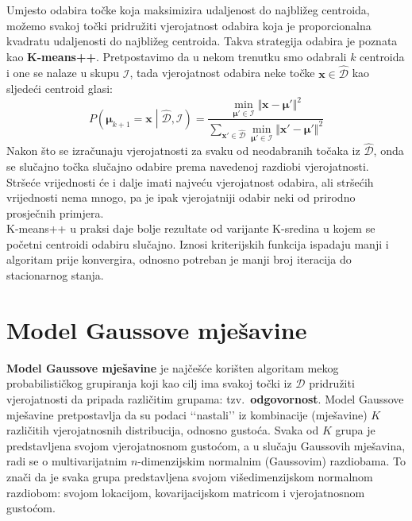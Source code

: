 \documentclass[times, utf8, zavrsni]{fer}
\begin{document}
Umjesto odabira točke koja maksimizira udaljenost do najbližeg centroida, možemo svakoj točki pridružiti vjerojatnost odabira koja je proporcionalna kvadratu udaljenosti do najbližeg centroida. Takva strategija odabira je poznata kao \textbf{K-means++}.
Pretpostavimo da u nekom trenutku smo odabrali $k$ centroida i one se nalaze u skupu $\mathcal{I}$, tada vjerojatnost odabira neke točke $\mathbf{x} \in \widehat{\mathcal{D}}$ kao sljedeći centroid glasi:
\[P \left( \boldsymbol{\mu}_{k+1} = \mathbf{x} \middle| \widehat{\mathcal{D}}, \mathcal{I}\right)
= \frac{\min_{\boldsymbol{\mu}' \in \mathcal{I}} \Vert \mathbf{x} - \boldsymbol{\mu}' \Vert^2}{\sum_{\mathbf{x}' \in \widehat{\mathcal{D}}} 
\min_{\boldsymbol{\mu}' \in \mathcal{I}} \Vert \mathbf{x}' - \boldsymbol{\mu}' \Vert^2}\]
Nakon što se izračunaju vjerojatnosti za svaku od neodabranih točaka iz $\widehat{\mathcal{D}}$, onda se slučajno točka slučajno odabire prema navedenoj razdiobi vjerojatnosti. Stršeće vrijednosti će i dalje imati najveću vjerojatnost odabira, ali stršećih vrijednosti nema mnogo, pa je ipak vjerojatniji odabir neki od prirodno prosječnih primjera.\\
K-means++ u praksi daje bolje rezultate od varijante K-sredina u kojem se početni centroidi odabiru slučajno. Iznosi kriterijskih funkcija ispadaju manji i algoritam prije konvergira, odnosno potreban je manji broj iteracija do stacionarnog stanja.

\section{Model Gaussove mješavine}
\label{gmm}
\textbf{Model Gaussove mješavine}  je najčešće korišten algoritam mekog probabilističkog grupiranja koji kao cilj ima svakoj točki iz $\mathcal{D}$ pridružiti vjerojatnosti da pripada različitim grupama: tzv.\ \textbf{odgovornost}. Model Gaussove mješavine pretpostavlja da su podaci ‘‘nastali’’ iz kombinacije (mješavine) $K$ različitih vjerojatnosnih distribucija, odnosno gustoća. Svaka od $K$ grupa je predstavljena svojom vjerojatnosnom gustoćom, a u slučaju Gaussovih mješavina, radi se o multivarijatnim $n$-dimenzijskim normalnim (Gaussovim) razdiobama. To znači da je svaka grupa predstavljena svojom višedimenzijskom normalnom razdiobom: svojom lokacijom, kovarijacijskom matricom i vjerojatnosnom gustoćom.
\end{document}
